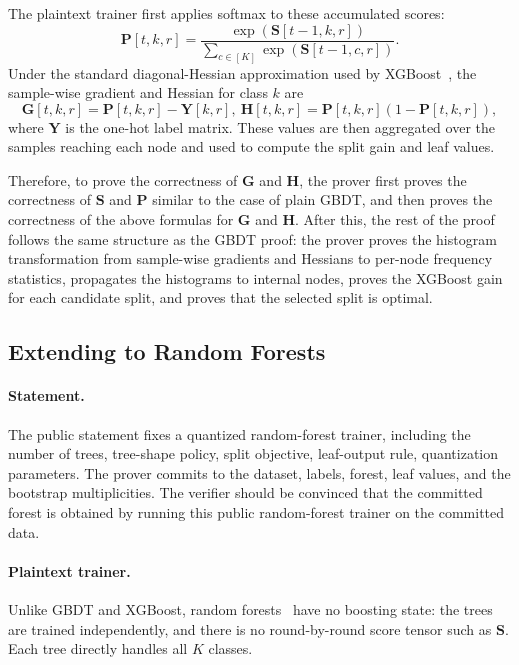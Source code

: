 The plaintext trainer first applies softmax to these accumulated scores:
\[
    \mathbf{P}[t,k,r]
    =
    \frac{\exp(\mathbf{S}[t-1,k,r])}
    {\sum_{c\in[K]}\exp(\mathbf{S}[t-1,c,r])}.
\]
Under the standard diagonal-Hessian approximation used by
XGBoost~\cite{xgboost16}, the sample-wise gradient and Hessian for class $k$
are
\[
    \mathbf{G}[t,k,r]=\mathbf{P}[t,k,r]-\mathbf{Y}[k,r],\ 
    \mathbf{H}[t,k,r]=\mathbf{P}[t,k,r](1-\mathbf{P}[t,k,r]),
\]
where $\mathbf{Y}$ is the one-hot label matrix. These values are then
aggregated over the samples reaching each node and used to compute the split
gain and leaf values.

Therefore, to prove the correctness of $\mathbf{G}$ and $\mathbf{H}$, the
prover first proves the correctness of $\mathbf{S}$ and $\mathbf{P}$
similar to the case of plain GBDT, and then proves the correctness of the above formulas for $\mathbf{G}$ and $\mathbf{H}$.
After this, the rest of the proof follows the same structure as the GBDT
proof: the prover proves the histogram transformation from sample-wise
gradients and Hessians to per-node frequency statistics, propagates the
histograms to internal nodes, proves the XGBoost gain for each candidate split,
and proves that the selected split is optimal.

\subsection{Extending to Random Forests}\label{app:rf-extension}

\paragraph{Statement.}
The public statement fixes a quantized random-forest trainer, including the
number of trees, tree-shape policy, split objective, leaf-output rule,
quantization parameters. The prover commits to the dataset, labels, forest, leaf values,
and the bootstrap multiplicities. The verifier should be convinced that the committed
forest is obtained by running this public random-forest trainer on the
committed data.

\paragraph{Plaintext trainer.}
Unlike GBDT and XGBoost, random forests~\cite{randomforsts01} have no boosting
state: the trees are trained independently, and there is no round-by-round score
tensor such as $\mathbf{S}$. Each tree directly handles all $K$ classes.


